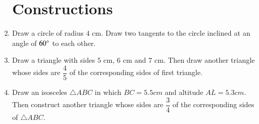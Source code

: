 \documentclass[12pt,-letter paper]{article}
\theoremstyle{remark}
\begin{document}
\begin{enumerate}
\section{Constructions}    
\item Draw a circle of radius $4$ cm. Draw two tangents to the circle inclined at an angle of $ 60 \degree $ to each other.\\
\item Draw a triangle with sides $5$ cm, $6$ cm and $7$ cm. Then draw another triangle whose sides are $\dfrac{4}{5}$ of the corresponding sides of first triangle.\\
\item Draw an isosceles $\triangle ABC$ in which $BC=5.5 cm$ and altitude $AL=5.3 cm$. Then construct another triangle whose sides are $\dfrac{3}{4}$ of the corresponding sides of $\triangle ABC$.\\
\end{enumerate}
\end{document}
